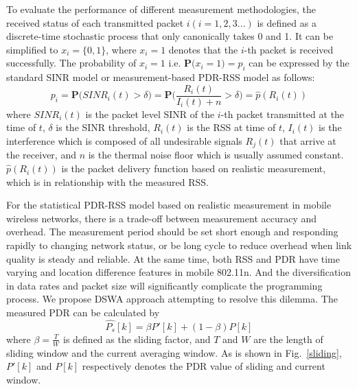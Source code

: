 \documentclass[journal,onecolumn,12pt]{IEEEtran}
\begin{document}
To evaluate the performance of different measurement methodologies, the received status of each transmitted packet $i(i=1,2,3...)$ is defined as a discrete-time stochastic process that only canonically takes 0 and 1. It can be simplified to $x_i=\{0,1\}$, where $x_i=1$ denotes that the $i$-th packet is received successfully. The probability of $x_i=1$ i.e. $\textbf{P(}x_i=1\textbf{)}=p_i$ can be expressed by the standard SINR model or measurement-based PDR-RSS model as follows:
\begin{equation}
 p_i=\textbf{P(}SINR_i(t)>\delta\textbf{)}=\textbf{P(}\frac{R_i(t)}{I_i(t)+n}>\delta\textbf{)}=\hat{p}(R_i(t))
\label{p_i}
\end{equation}
where $SINR_i(t)$ is the packet level SINR of the $i$-th packet transmitted at the time of $t$, $\delta$ is the SINR threshold, $R_i(t)$ is the RSS at time of $t$, $I_i(t)$ is the interference which is composed of all undesirable signals $R_j(t)$ that arrive at the receiver, and $n$ is the thermal noise floor which is usually assumed constant. $\hat{p}(R_i(t))$ is the packet delivery function based on realistic measurement, which is in relationship with the measured RSS. 

For the statistical PDR-RSS model based on realistic measurement in mobile wireless networks, there is a trade-off between measurement accuracy and overhead. The measurement period should be set short enough and responding rapidly to changing network status, or be long cycle to reduce overhead when link quality is steady and reliable. At the same time, both RSS and PDR have time varying and location difference features in mobile 802.11n. And the diversification in data rates and packet size will significantly complicate the programming process. We propose DSWA approach attempting to resolve this dilemma. The measured PDR can be calculated by
\begin{equation}
 \hat{P_s}[k]=\beta P'[k]+(1-\beta)P[k]
 \label{P_s}
\end{equation}
where $\beta=\frac{T}{W}$ is defined as the sliding factor, and $T$ and $W$ are the length of sliding window and the current averaging window. As is shown in Fig.~\ref{sliding}, $P'[k]$ and $P[k]$ respectively denotes the PDR value of sliding and current window.
\end{document}
